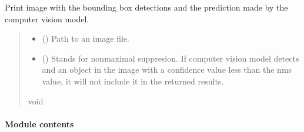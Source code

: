 \documentclass[letterpaper,10pt,english]{sphinxmanual}
\begin{document}
\begin{fulllineitems}

\begin{fulllineitems}
\label{\detokenize{comp_viz.object_detection:comp_viz.object_detection.model.Model.show_image_prediction}}
\pysigstartsignatures
{}
\pysigstopsignatures
\sphinxAtStartPar
Print image with the bounding box detections and the prediction made by the computer vision model.
\begin{quote}\begin{description}
\begin{itemize}
\item {} 
\sphinxAtStartPar
{} () \textendash{} Path to an image file.

\item {} 
\sphinxAtStartPar
{} () \textendash{} Stands for non\sphinxhyphen{}maximal suppresion. If computer vision model detects and an 
object in the image with a confidence value less than the nms value, it 
will not include it in the returned results.

\end{itemize}

\sphinxAtStartPar
void

\end{description}\end{quote}

\end{fulllineitems}


\end{fulllineitems}



\paragraph{Module contents}
\label{\detokenize{comp_viz.object_detection:module-comp_viz.object_detection}}\label{\detokenize{comp_viz.object_detection:module-contents}}
\end{document}
